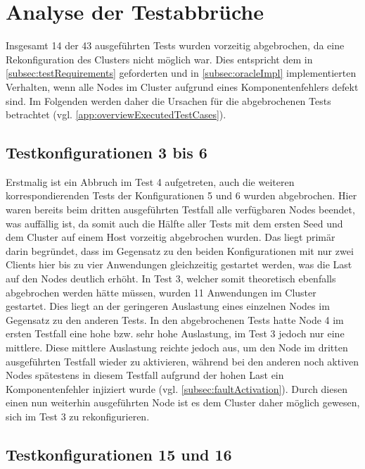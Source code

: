 \section{Analyse der Testabbrüche}
\label{sec:noReconfig}

Insgesamt 14 der 43 ausgeführten Tests wurden vorzeitig abgebrochen, da eine Rekonfiguration des Clusters nicht möglich war.
Dies entspricht dem in \cref{subsec:testRequirements} geforderten und in \cref{subsec:oracleImpl} implementierten Verhalten, wenn alle Nodes im Cluster aufgrund eines Komponentenfehlers defekt sind.
Im Folgenden werden daher die Ursachen für die abgebrochenen Tests betrachtet (vgl. \cref{app:overviewExecutedTestCases}).

\subsection{Testkonfigurationen 3 bis 6}
\label{subsec:noReconf36}

Erstmalig ist ein Abbruch im Test 4 aufgetreten, auch die weiteren korrespondierenden Tests der Konfigurationen 5 und 6 wurden abgebrochen.
Hier waren bereits beim dritten ausgeführten Testfall alle verfügbaren Nodes beendet, was auffällig ist, da somit auch die Hälfte aller Tests mit dem ersten Seed und dem Cluster auf einem Host vorzeitig abgebrochen wurden.
Das liegt primär darin begründet, dass im Gegensatz zu den beiden Konfigurationen mit nur zwei Clients hier bis zu vier Anwendungen gleichzeitig gestartet werden, was die Last auf den Nodes deutlich erhöht.
In Test 3, welcher somit theoretisch ebenfalls abgebrochen werden hätte müssen, wurden 11 Anwendungen im Cluster gestartet.
Dies liegt an der geringeren Auslastung eines einzelnen Nodes im Gegensatz zu den anderen Tests.
In den abgebrochenen Tests hatte Node 4 im ersten Testfall eine hohe bzw. sehr hohe Auslastung, im Test 3 jedoch nur eine mittlere.
Diese mittlere Auslastung reichte jedoch aus, um den Node im dritten ausgeführten Testfall wieder zu aktivieren, während bei den anderen noch aktiven Nodes spätestens in diesem Testfall aufgrund der hohen Last ein Komponentenfehler injiziert wurde (vgl. \cref{subsec:faultActivation}).
Durch diesen einen nun weiterhin ausgeführten Node ist es dem Cluster daher möglich gewesen, sich im Test 3 zu rekonfigurieren.

\subsection{Testkonfigurationen 15 und 16}
\label{subsec:noReconf1516}

